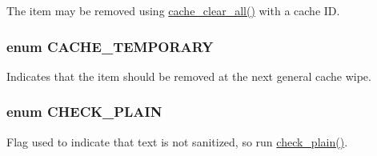 The item may be removed using \hyperlink{includes_2cache_8inc_a409b34dd629640d791a11736a9de8125}{cache\_\-clear\_\-all()} with a cache ID. \hypertarget{bootstrap_8inc_a1f2558e91eb9f33d14168bb8dfd99690}{
\subsubsection[{CACHE\_\-TEMPORARY}]{\setlength{\rightskip}{0pt plus 5cm}enum {\bf CACHE\_\-TEMPORARY}}}
\label{bootstrap_8inc_a1f2558e91eb9f33d14168bb8dfd99690}
Indicates that the item should be removed at the next general cache wipe. \hypertarget{bootstrap_8inc_a7b115778ff532867b7af4c53d39a1de2}{
\subsubsection[{CHECK\_\-PLAIN}]{\setlength{\rightskip}{0pt plus 5cm}enum {\bf CHECK\_\-PLAIN}}}
\label{bootstrap_8inc_a7b115778ff532867b7af4c53d39a1de2}
Flag used to indicate that text is not sanitized, so run \hyperlink{group__sanitization_ga76fc67a30fd8d75ddd80565e6e65a13d}{check\_\-plain()}.

